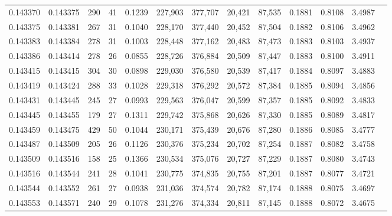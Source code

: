 \begin{tabular}{rrrrrrrrrrrrr}
0.143370 & 0.143375 &   290 &  41 &                                     0.1239 & 227,903 & 377,707 &  20,421 &  87,535 & 0.1881 & 0.8108 & 3.4987 \\
0.143375 & 0.143381 &   267 &  31 &                                     0.1040 & 228,170 & 377,440 &  20,452 &  87,504 & 0.1882 & 0.8106 & 3.4962 \\
0.143383 & 0.143384 &   278 &  31 &                                     0.1003 & 228,448 & 377,162 &  20,483 &  87,473 & 0.1883 & 0.8103 & 3.4937 \\
0.143386 & 0.143414 &   278 &  26 &                                     0.0855 & 228,726 & 376,884 &  20,509 &  87,447 & 0.1883 & 0.8100 & 3.4911 \\
0.143415 & 0.143415 &   304 &  30 &                                     0.0898 & 229,030 & 376,580 &  20,539 &  87,417 & 0.1884 & 0.8097 & 3.4883 \\
0.143419 & 0.143424 &   288 &  33 &                                     0.1028 & 229,318 & 376,292 &  20,572 &  87,384 & 0.1885 & 0.8094 & 3.4856 \\
0.143431 & 0.143445 &   245 &  27 &                                     0.0993 & 229,563 & 376,047 &  20,599 &  87,357 & 0.1885 & 0.8092 & 3.4833 \\
0.143445 & 0.143455 &   179 &  27 &                                     0.1311 & 229,742 & 375,868 &  20,626 &  87,330 & 0.1885 & 0.8089 & 3.4817 \\
0.143459 & 0.143475 &   429 &  50 &                                     0.1044 & 230,171 & 375,439 &  20,676 &  87,280 & 0.1886 & 0.8085 & 3.4777 \\
0.143487 & 0.143509 &   205 &  26 &                                     0.1126 & 230,376 & 375,234 &  20,702 &  87,254 & 0.1887 & 0.8082 & 3.4758 \\
0.143509 & 0.143516 &   158 &  25 &                                     0.1366 & 230,534 & 375,076 &  20,727 &  87,229 & 0.1887 & 0.8080 & 3.4743 \\
0.143516 & 0.143544 &   241 &  28 &                                     0.1041 & 230,775 & 374,835 &  20,755 &  87,201 & 0.1887 & 0.8077 & 3.4721 \\
0.143544 & 0.143552 &   261 &  27 &                                     0.0938 & 231,036 & 374,574 &  20,782 &  87,174 & 0.1888 & 0.8075 & 3.4697 \\
0.143553 & 0.143571 &   240 &  29 &                                     0.1078 & 231,276 & 374,334 &  20,811 &  87,145 & 0.1888 & 0.8072 & 3.4675 \\

\end{tabular}
